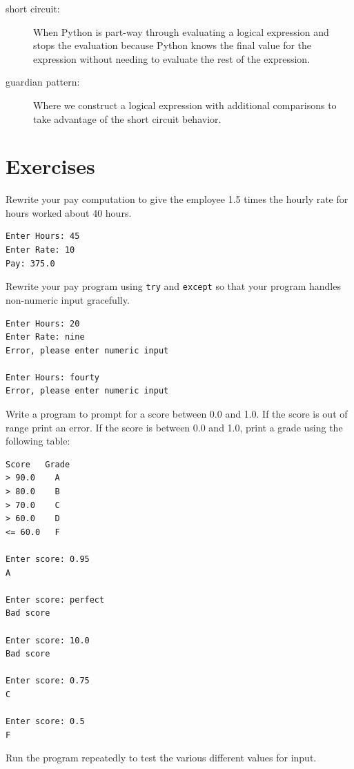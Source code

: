 \documentclass[10pt]{book}
\begin{document}
\begin{description}
\item[short circuit:]  When Python is part-way through evaluating a 
logical expression and stops the evaluation because Python 
knows the final value for the expression 
without needing to evaluate the rest of the expression.

\item[guardian pattern:] Where we construct a logical expression 
with additional
comparisons to take advantage of the short circuit behavior.

\end{description}

\section{Exercises}

\begin{ex}
Rewrite your pay computation to give the employee 1.5 
times the hourly rate for 
hours worked about 40 hours.

\begin{verbatim}
Enter Hours: 45
Enter Rate: 10
Pay: 375.0
\end{verbatim}
\end{ex}

\begin{ex}
Rewrite your pay program using {\tt try} and {\tt except} 
so that your program handles non-numeric input gracefully.

\begin{verbatim}
Enter Hours: 20
Enter Rate: nine
Error, please enter numeric input

Enter Hours: fourty
Error, please enter numeric input
\end{verbatim}
\end{ex}

\begin{ex}
Write a program to prompt for a score between 0.0 and 1.0.
If the score is out of range print an error.  If the score
is between 0.0 and 1.0, print a grade using the following 
table:
\begin{verbatim}
Score   Grade
> 90.0    A
> 80.0    B
> 70.0    C
> 60.0    D
<= 60.0   F

Enter score: 0.95
A

Enter score: perfect
Bad score

Enter score: 10.0
Bad score

Enter score: 0.75
C

Enter score: 0.5
F
\end{verbatim}

Run the program repeatedly to test the various different values
for input.
\end{ex}
\end{document}
